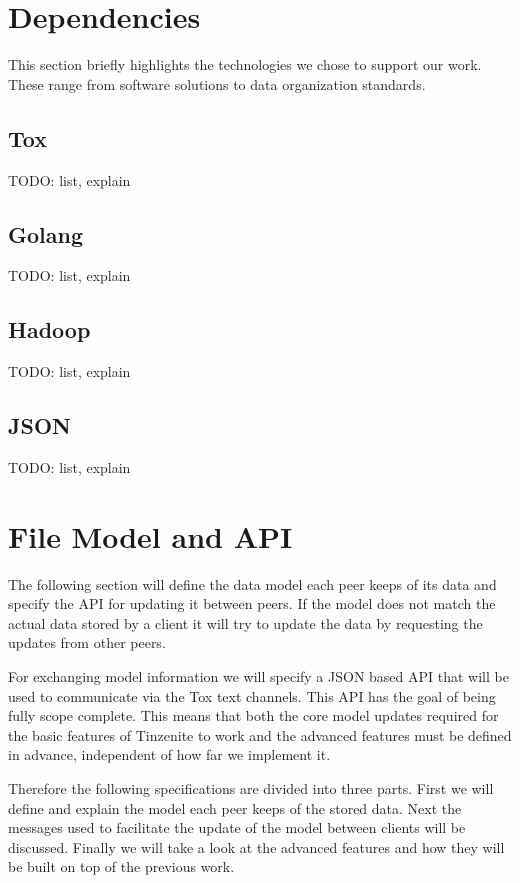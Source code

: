 \section{Dependencies}

This section briefly highlights the technologies we chose to support our work.
These range from software solutions to data organization standards.

\subsection{Tox}

TODO: list, explain

\subsection{Golang}

TODO: list, explain

\subsection{Hadoop}

TODO: list, explain

\subsection{JSON}

TODO: list, explain

\section{File Model and API}

The following section will define the data model each peer keeps of its data and specify the API for updating it between peers.
If the model does not match the actual data stored by a client it will try to update the data by requesting the updates from other peers.

For exchanging model information we will specify a JSON based API that will be used to communicate via the Tox text channels.
This API has the goal of being fully scope complete.
This means that both the core model updates required for the basic features of Tinzenite to work and the advanced features must be defined in advance, independent of how far we implement it.

Therefore the following specifications are divided into three parts.
First we will define and explain the model each peer keeps of the stored data.
Next the messages used to facilitate the update of the model between clients will be discussed.
Finally we will take a look at the advanced features and how they will be built on top of the previous work.


